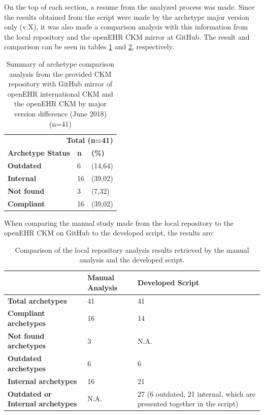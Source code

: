 \documentclass[mim_thesis.tex]{subfiles}
\begin{document}
On the top of each section, a resume from the analyzed process was made. Since the results obtained from the script were made by the archetype major version only (v.X), it was also made a comparison analysis with this information from the local repository and the openEHR CKM mirror at GitHub. The result and comparison can be seen in tables \ref{tab:repos_comp_mv} and \ref{tab:comp_manual_script}, respectively.

\begin{table}[H]
	\centering
	\caption{Summary of archetype comparison analysis from the provided CKM repository with GitHub mirror of openEHR international CKM and the openEHR CKM by major version difference (June 2018) (n=41)}
	\label{tab:repos_comp_mv}
	\begin{tabular}{lll}
		\toprule[2pt]
		\multicolumn{3}{r}{\textbf{ Total (n=41) }} \\
		\cmidrule(r){2-3}
		\textbf{Archetype Status}   & \textbf{n} & \textbf{(\%)} \\
		\midrule[2pt]
		\textbf{Outdated } & 6 & (14,64) \\
		\midrule
		\textbf{Internal } & 16 & (39,02) \\
		\midrule
		\textbf{Not found } & 3 & (7,32) \\
        \midrule
		\textbf{Compliant } & 16 & (39,02) \\
		\bottomrule[2pt]
	\end{tabular}
\end{table}

When comparing the manual study made from the local repository to the openEHR CKM on GitHub to the developed script, the results are:

\begin{table}[H]
\centering
\caption{Comparison of the local repository analysis results retrieved by the manual analysis and the developed script. }
\label{tab:comp_manual_script}
\begin{tabular}{p{6cm} p{3cm} p{6.5cm}}
\toprule[2pt]
\textbf{ } & \textbf{Manual Analysis} & \textbf{Developed Script} \\ \midrule[2pt]
\textbf{Total archetypes}  & 41 & 41 \\ \midrule
\textbf{Compliant archetypes} & 16 & 14 \\ \midrule
\textbf{Not found archetypes} & 3 & N.A. \\ \midrule
\textbf{Outdated archetypes} & 6 & 6 \\ \midrule
\textbf{Internal archetypes} & 16 & 21 \\ \midrule
\textbf{Outdated or Internal archetypes} & N.A. & 27 (6 outdated, 21 internal, which are presented together in the script)
\\ \bottomrule[2pt]
\end{tabular}
\end{table}
\end{document}
